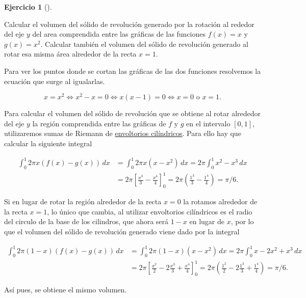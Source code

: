 \documentclass[
  spanish,
  a4paper,
]{scrreport}
\theoremstyle{definition}
\newtheorem{exercise}{Ejercicio}[chapter]
\theoremstyle{remark}
\begin{document}
\begin{exercise}[]\protect\hypertarget{exr-volumen-revolucion}{}\label{exr-volumen-revolucion}

Calcular el volumen del sólido de revolución generado por la rotación al
rededor del eje \(y\) del area comprendida entre las gráficas de las
funciones \(f(x)=x\) y \(g(x)=x^2\). Calcular también el volumen del
sólido de revolución generado al rotar esa misma área alrededor de la
recta \(x=1\).

\end{exercise}

\begin{tcolorbox}[enhanced jigsaw, arc=.35mm, bottomrule=.15mm, bottomtitle=1mm, breakable, colback=white, colbacktitle=quarto-callout-tip-color!10!white, colframe=quarto-callout-tip-color-frame, coltitle=black, left=2mm, leftrule=.75mm, opacityback=0, opacitybacktitle=0.6, rightrule=.15mm, title=\textcolor{quarto-callout-tip-color}{\faLightbulb}\hspace{0.5em}{Solución}, titlerule=0mm, toprule=.15mm, toptitle=1mm]

Para ver los puntos donde se cortan las gráficas de las dos funciones
resolvemos la ecuación que surge al igualarlas.

\[
x = x^2 \Leftrightarrow x^2-x = 0 \Leftrightarrow x(x-1)= 0 \Leftrightarrow x=0 \mbox{ o } x=1.
\]

Para calcular el volumen del sólido de revolución que se obtiene al
rotar alrededor del eje \(y\) la región comprendida entre las gráficas
de \(f\) y \(g\) en el intervalo \([0,1]\), utilizaremos sumas de
Riemann de
\href{https://aprendeconalf.es/analisis-manual/08-integrales.html\#c\%C3\%A1lculo-de-vol\%C3\%BAmenes-con-envoltorios-cil\%C3\%ADndricos}{envoltorios
cilíndricos}. Para ello hay que calcular la siguiente integral

\begin{align*}
\int_0^1 2\pi x (f(x)-g(x))\,dx 
&= \int_0^1 2\pi x (x-x^2)\,dx 
= 2\pi \int_0^1 x^2-x^3 \, dx \\
&= 2\pi \left[\frac{x^3}{3}-\frac{x^4}{4}\right]_0^1
= 2\pi \left(\frac{1^3}{3}-\frac{1^4}{4}\right)
= \pi/6.
\end{align*}

Si en lugar de rotar la región alrededor de la recta \(x=0\) la rotamos
alrededor de la recta \(x=1\), lo único que cambia, al utilizar
envoltorios cilíndricos es el radio del circulo de la base de los
cilindros, que ahora será \(1-x\) en lugar de \(x\), por lo que el
volumen del sólido de revolución generado viene dado por la integral

\begin{align*}
\int_0^1 2\pi (1-x) (f(x)-g(x))\,dx 
&= \int_0^1 2\pi (1-x) (x-x^2)\,dx 
= 2\pi \int_0^1 x-2x^2+x^3 \, dx \\
&= 2\pi \left[\frac{x^2}{2}-2\frac{x^3}{3}+\frac{x^4}{4}\right]_0^1
= 2\pi \left(\frac{1^2}{2}-2\frac{1^3}{3}+\frac{1^4}{4}\right)
= \pi/6.
\end{align*}

Así pues, se obtiene el mismo volumen.

\end{tcolorbox}
\end{document}
